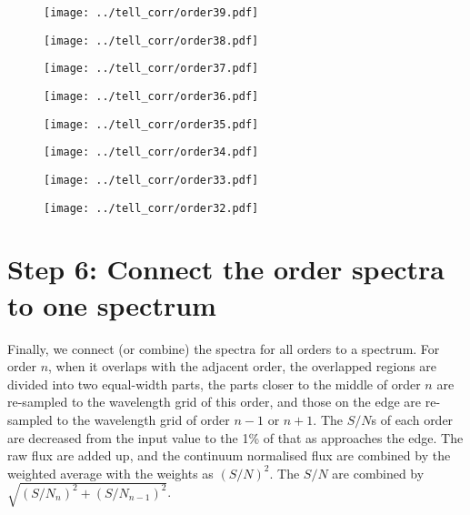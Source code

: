\documentclass{article}
\begin{document}
\begin{figure}[H]
    \centering
    \texttt{[image: ../tell\_corr/order39.pdf]}
\end{figure}
\begin{figure}[H]
    \centering
    \texttt{[image: ../tell\_corr/order38.pdf]}
\end{figure}
\begin{figure}[H]
    \centering
    \texttt{[image: ../tell\_corr/order37.pdf]}
\end{figure}
\begin{figure}[H]
    \centering
    \texttt{[image: ../tell\_corr/order36.pdf]}
\end{figure}
\begin{figure}[H]
    \centering
    \texttt{[image: ../tell\_corr/order35.pdf]}
\end{figure}
\begin{figure}[H]
    \centering
    \texttt{[image: ../tell\_corr/order34.pdf]}
\end{figure}
\begin{figure}[H]
    \centering
    \texttt{[image: ../tell\_corr/order33.pdf]}
\end{figure}
\begin{figure}[H]
    \centering
    \texttt{[image: ../tell\_corr/order32.pdf]}
\end{figure}

\newpage

\section{Step 6: Connect the order spectra to one spectrum}

Finally, we connect (or combine) the spectra for all orders to a spectrum.
For order $n$, when it overlaps with the adjacent order, the overlapped regions are divided into two equal-width parts, the parts closer to the middle of order $n$ are re-sampled to the wavelength grid of this order, and those on the edge are re-sampled to the wavelength grid of order $n-1$ or $n+1$.
The $S/N$s of each order are decreased from the input value to the 1\% of that as approaches the edge. 
The raw flux are added up, and the continuum normalised flux are combined by the weighted average with the weights as $(S/N)^2$.
The $S/N$ are combined by $\sqrt{(S/N_n)^2 + (S/N_{n-1})^2}$.
\end{document}
